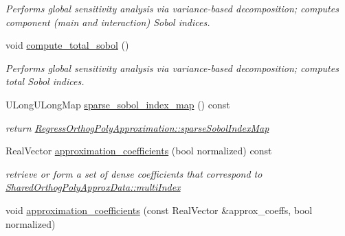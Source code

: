 \begin{DoxyCompactItemize}
\begin{DoxyCompactList}\small\item\em Performs global sensitivity analysis via variance-\/based decomposition; computes component (main and interaction) Sobol\textquotesingle{} indices. \end{DoxyCompactList}\item 
void \hyperlink{classPecos_1_1RegressOrthogPolyApproximation_ada0deadfa2c3202ed4e58d066ee079f2}{compute\+\_\+total\+\_\+sobol} ()\label{classPecos_1_1RegressOrthogPolyApproximation_ada0deadfa2c3202ed4e58d066ee079f2}

\begin{DoxyCompactList}\small\item\em Performs global sensitivity analysis via variance-\/based decomposition; computes total Sobol\textquotesingle{} indices. \end{DoxyCompactList}\item 
U\+Long\+U\+Long\+Map \hyperlink{classPecos_1_1RegressOrthogPolyApproximation_a0edcfdc2d2b3f4e37d3a3f7d591cf9e0}{sparse\+\_\+sobol\+\_\+index\+\_\+map} () const \label{classPecos_1_1RegressOrthogPolyApproximation_a0edcfdc2d2b3f4e37d3a3f7d591cf9e0}

\begin{DoxyCompactList}\small\item\em return \hyperlink{classPecos_1_1RegressOrthogPolyApproximation_ac024e059bf921ce1d6aaf0506066b8a3}{Regress\+Orthog\+Poly\+Approximation\+::sparse\+Sobol\+Index\+Map} \end{DoxyCompactList}\item 
Real\+Vector \hyperlink{classPecos_1_1RegressOrthogPolyApproximation_ac64f16ff9fbfb80c4bafa969b4a92e1d}{approximation\+\_\+coefficients} (bool normalized) const \label{classPecos_1_1RegressOrthogPolyApproximation_ac64f16ff9fbfb80c4bafa969b4a92e1d}

\begin{DoxyCompactList}\small\item\em retrieve or form a set of dense coefficients that correspond to \hyperlink{classPecos_1_1SharedOrthogPolyApproxData_a0fbdd5817bc6dd026f6d42269ca8e703}{Shared\+Orthog\+Poly\+Approx\+Data\+::multi\+Index} \end{DoxyCompactList}\item 
void \hyperlink{classPecos_1_1RegressOrthogPolyApproximation_a2e7b82322962df3fd036b9e0783d8fc9}{approximation\+\_\+coefficients} (const Real\+Vector \&approx\+\_\+coeffs, bool normalized)\label{classPecos_1_1RegressOrthogPolyApproximation_a2e7b82322962df3fd036b9e0783d8fc9}


\end{DoxyCompactItemize}
